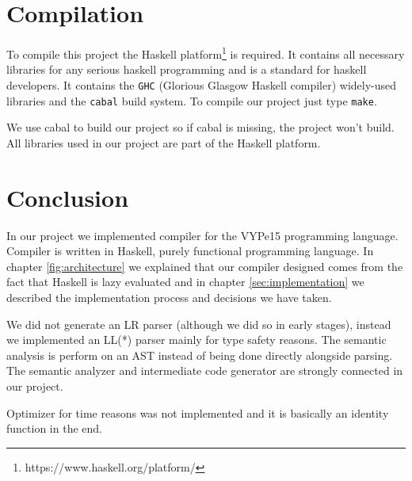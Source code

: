 \documentclass[titlepage]{article}
\begin{document}
\section{Compilation}
To compile this project the Haskell platform\footnote{https://www.haskell.org/platform/}
is required. It contains all necessary libraries for any serious haskell programming
and is a standard for haskell developers. It contains the \texttt{GHC} (Glorious Glasgow
Haskell compiler) widely-used libraries and the \texttt{cabal} build system.
To compile our project just type \texttt{make}.

We use cabal to build our project so if cabal is missing, the project won't build. 
All libraries used in our project are part of the Haskell platform.

\section{Conclusion}
In our project we implemented compiler for the VYPe15 programming language. Compiler
is written in Haskell, purely functional programming language. In chapter 
\ref{fig:architecture} we explained that our compiler designed comes from the fact
that Haskell is lazy evaluated and in chapter \ref{sec:implementation} we described the 
implementation process and decisions we have taken.

We did not generate an LR parser (although we did so in early stages), instead we
implemented an LL(*) parser mainly for type safety reasons. The semantic analysis is 
perform on an AST instead of being done directly alongside parsing. The semantic analyzer
and intermediate code generator are strongly connected in our project. 

Optimizer for time reasons was not implemented and it is basically an identity
function in the end. 


\newpage


\end{document}
